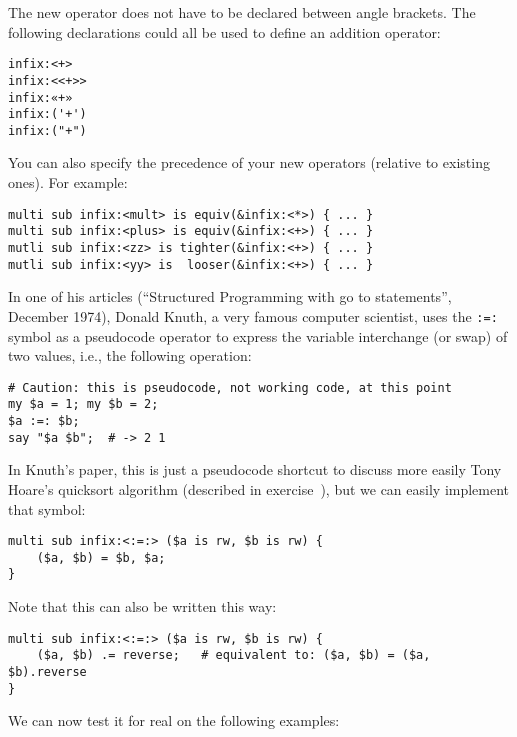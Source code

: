The new operator does not have to be declared between 
angle brackets. The following declarations could 
all be used to define an addition operator:

\begin{verbatim}
infix:<+>
infix:<<+>>
infix:«+»
infix:('+')
infix:("+")
\end{verbatim}

You can also specify the precedence of your new 
operators (relative to existing ones). For example:

\begin{verbatim}
multi sub infix:<mult> is equiv(&infix:<*>) { ... }
multi sub infix:<plus> is equiv(&infix:<+>) { ... }
mutli sub infix:<zz> is tighter(&infix:<+>) { ... }
mutli sub infix:<yy> is  looser(&infix:<+>) { ... }
\end{verbatim}

In one of his articles (``Structured Programming with 
go to statements'', December 1974), Donald Knuth, a very famous 
computer scientist, uses the \verb':=:' symbol as a 
pseudocode operator to express the variable interchange 
(or swap) of two values, i.e., the following operation:

\begin{verbatim}
# Caution: this is pseudocode, not working code, at this point
my $a = 1; my $b = 2;
$a :=: $b; 
say "$a $b";  # -> 2 1 
\end{verbatim}

In Knuth's paper, this is just a pseudocode shortcut 
to discuss more easily Tony Hoare's quicksort algorithm 
(described in exercise~), 
but we can easily implement that symbol:

\begin{verbatim}
multi sub infix:<:=:> ($a is rw, $b is rw) {
    ($a, $b) = $b, $a;
}
\end{verbatim}

Note that this can also be written this way:

\begin{verbatim}
multi sub infix:<:=:> ($a is rw, $b is rw) {
    ($a, $b) .= reverse;   # equivalent to: ($a, $b) = ($a, $b).reverse 
}
\end{verbatim}

We can now test it for real on the following examples:

